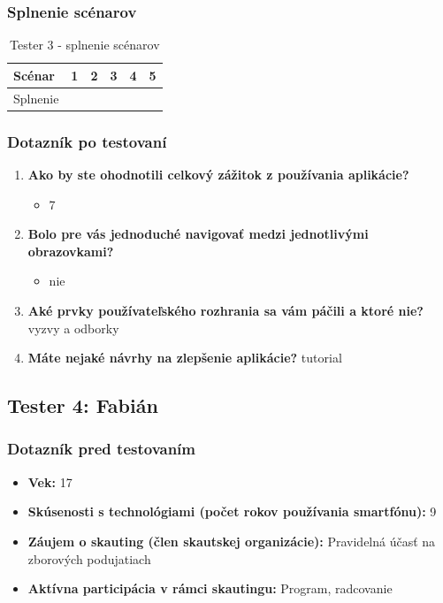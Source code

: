 \subsubsection*{Splnenie scénarov}
\begin{table}[h!]
    \centering
    \begin{tabular}{|l|p{1.5cm}|p{1.5cm}|p{1.5cm}|p{1.5cm}|p{1.5cm}|}
        \hline
        Scénar & 1 & 2 & 3 & 4 & 5 \\ \hline
        Splnenie & & & & & \\ \hline
    \end{tabular}
    \caption{Tester 3 - splnenie scénarov}
\end{table}

\subsubsection*{Dotazník po testovaní}
\begin{enumerate}[leftmargin=*]
    \item \textbf{Ako by ste ohodnotili celkový zážitok z používania aplikácie?}
    \begin{itemize}
        \item 7
    \end{itemize}
    \item \textbf{Bolo pre vás jednoduché navigovať medzi jednotlivými obrazovkami?}
    \begin{itemize}
        \item nie
    \end{itemize}
    \item \textbf{Aké prvky používateľského rozhrania sa vám páčili a ktoré nie?} vyzvy a odborky
    \item \textbf{Máte nejaké návrhy na zlepšenie aplikácie?} tutorial
\end{enumerate}

\subsection*{Tester 4: Fabián}
\subsubsection*{Dotazník pred testovaním}
\begin{itemize}[leftmargin=*]
    \item \textbf{Vek:} 17
    \item \textbf{Skúsenosti s technológiami (počet rokov používania smartfónu):} 9
    \item \textbf{Záujem o skauting (člen skautskej organizácie):} Pravidelná účasť na zborových podujatiach
    \item \textbf{Aktívna participácia v rámci skautingu:} Program, radcovanie
\end{itemize}

